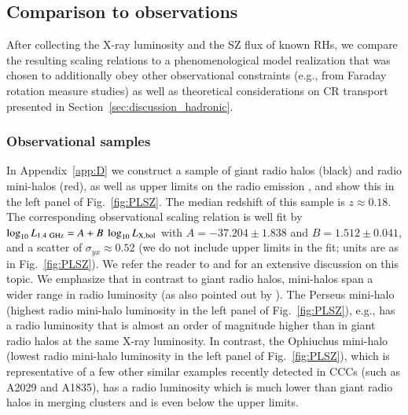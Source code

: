 \documentclass[useAMS,usenatbib]{mn2e}
\begin{document}
\subsection{Comparison to observations}
\label{sec:scaling-obs}
 
After collecting the X-ray luminosity and the SZ flux of known RHs, we compare
the resulting scaling relations to a phenomenological model realization that was
chosen to additionally obey other observational constraints (e.g., from Faraday
rotation measure studies) as well as theoretical considerations on CR transport
presented in Section~\ref{sec:discussion_hadronic}.


\subsubsection{Observational samples}

In Appendix~\ref{app:D} we construct a sample of giant radio halos (black) and
radio mini-halos (red), as well as upper limits on the radio emission
\citep{2009A&A...499..371G,2009A&A...507..661B, 2011A&A...527A..99E}, and show
this in the left panel of Fig.~\ref{fig:PLSZ}. The median redshift of this
sample is $z\approx0.18$. The corresponding observational scaling relation is
well fit by $\log_{10} L_{1.4~{\mathrm{GHz}}} = A + B~\log_{10} L_{{\mathrm{X,bol}}}$ with
$A=-37.204\pm1.838$ and $B=1.512\pm0.041$, and a scatter of $\sigma_{yx} \approx
0.52$ (we do not include upper limits in the fit; units are as in
Fig.~\ref{fig:PLSZ}). We refer the reader to \cite{2009A&A...507..661B} and
\cite{2011A&A...527A..99E} for an extensive discussion on this topic. We
emphasize that in contrast to giant radio halos, mini-halos span a wider range
in radio luminosity (as also pointed out by \citealp{2009A&A...499..679M}). The
Perseus mini-halo (highest radio mini-halo luminosity in the left panel of
Fig.~\ref{fig:PLSZ}), e.g., has a radio luminosity that is almost an order of
magnitude higher than in giant radio halos at the same X-ray luminosity. In
contrast, the Ophiuchus mini-halo (lowest radio mini-halo luminosity in the left
panel of Fig.~\ref{fig:PLSZ}), which is representative of a few other similar
examples recently detected in CCCs (such as A2029 and A1835), has a radio
luminosity which is much lower than giant radio halos in merging clusters and is
even below the upper limits.
\end{document}
